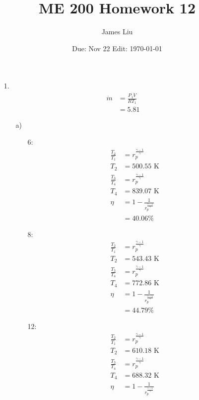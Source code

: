 \documentclass{article}
\date{Due: Nov 22 Edit: \today}
\title{ME 200 Homework 12}
\author{James Liu}
\begin{document}
\maketitle
\begin{itemize}
    \item [1.] 
    \begin{align*}
        \dot m&=\frac{P_1\dot V}{RT_1}\\
        &=5.81
    \end{align*}
    \begin{itemize}
        \item [a)]
        \begin{itemize}
            \item [6:]
            \begin{align*}
                \frac{T_2}{T_1}&=r_p^{\frac{\gamma-1}{\gamma}}\\
                T_2&=500.55 \text{ K}\\
                \frac{T_3}{T_4}&=r_p^{\frac{\gamma-1}{\gamma}}\\
                T_4&=839.07\text{ K}\\
                \eta &= 1-\frac{1}{r_p^{\frac{\gamma-1}{\gamma}}}\\
                &=40.06\%
            \end{align*}
            \item [8:]
            \begin{align*}
                \frac{T_2}{T_1}&=r_p^{\frac{\gamma-1}{\gamma}}\\
                T_2&=543.43 \text{ K}\\
                \frac{T_3}{T_4}&=r_p^{\frac{\gamma-1}{\gamma}}\\
                T_4&=772.86\text{ K}\\
                \eta &= 1-\frac{1}{r_p^{\frac{\gamma-1}{\gamma}}}\\
                &=44.79\%
            \end{align*}
            \item [12:]
            \begin{align*}
                \frac{T_2}{T_1}&=r_p^{\frac{\gamma-1}{\gamma}}\\
                T_2&=610.18 \text{ K}\\
                \frac{T_3}{T_4}&=r_p^{\frac{\gamma-1}{\gamma}}\\
                T_4&=688.32\text{ K}\\
                \eta &= 1-\frac{1}{r_p^{\frac{\gamma-1}{\gamma}}}\\

\end{align*}
\end{itemize}
\end{itemize}
\end{itemize}
\end{document}

